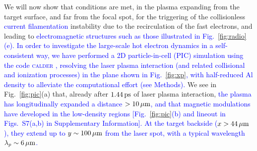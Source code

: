 \documentclass[aps,twocolumn,showpacs,superscriptaddress]{revtex4}
\begin{document}
We will now show that conditions are met, in the plasma  expanding from the target surface, and far from the focal spot, for the triggering of the collisionless \textcolor{blue}{current filamentation} instability due to the recirculation of the fast electrons, and leading to \textcolor{blue}{electromagnetic structures such as those illustrated in Fig.~\ref{fig:radio}(e). In order to investigate the large-scale hot electron dynamics in a self-consistent way, we have performed a 2D particle-in-cell (PIC) simulation using the code \textsc{calder} \cite{NF_Lefebvre_2003}, resolving the laser plasma interaction (and related collisional and ionization processes) in the plane shown in Fig.~\ref{fig:xp}, with half-reduced Al density to alleviate the computational effort (see Methods).}
We see in Fig.~\ref{fig:pic}(a) that, already after $1.44\,\rm ps$ of laser plasma interaction, \textcolor{blue}{the plasma has longitudinally expanded a distance $>10\,\rm \mu m$, and that magnetic modulations have developed in the low-density regions [Fig.~\ref{fig:pic}(b) and lineout in Figs.~S7(a,b) in Supplementary Information]. At the target backside ($x>44\,\rm \mu m$), they extend up to $y \sim 100\,\rm \mu m$ from the laser spot, with a typical wavelength $\lambda_p \sim 6\,\rm \mu m$.}
\end{document}
